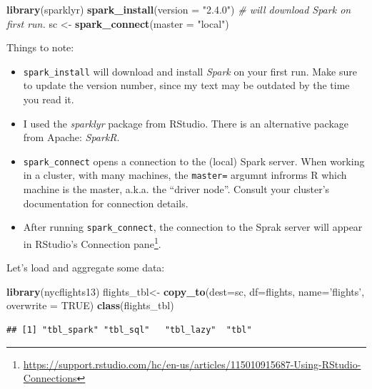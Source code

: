 \documentclass[]{book}
\newenvironment{Shaded}{\begin{snugshade}}{\end{snugshade}}
\newcommand{\CommentTok}[1]{\textcolor[rgb]{0.56,0.35,0.01}{\textit{#1}}}
\newcommand{\DataTypeTok}[1]{\textcolor[rgb]{0.13,0.29,0.53}{#1}}
\newcommand{\KeywordTok}[1]{\textcolor[rgb]{0.13,0.29,0.53}{\textbf{#1}}}
\newcommand{\NormalTok}[1]{#1}
\newcommand{\OtherTok}[1]{\textcolor[rgb]{0.56,0.35,0.01}{#1}}
\newcommand{\StringTok}[1]{\textcolor[rgb]{0.31,0.60,0.02}{#1}}
\providecommand{\tightlist}{%
  \setlength{\itemsep}{0pt}\setlength{\parskip}{0pt}}
\renewcommand{\href}[2]{#2\footnote{\url{#1}}}
\theoremstyle{definition}
\theoremstyle{definition}
\theoremstyle{definition}
\theoremstyle{remark}
\begin{document}
\begin{Shaded}
\begin{Highlighting}[]
\KeywordTok{library}\NormalTok{(sparklyr)}
\KeywordTok{spark_install}\NormalTok{(}\DataTypeTok{version =} \StringTok{"2.4.0"}\NormalTok{) }\CommentTok{# will download Spark on first run. }
\NormalTok{sc <-}\StringTok{ }\KeywordTok{spark_connect}\NormalTok{(}\DataTypeTok{master =} \StringTok{"local"}\NormalTok{)}
\end{Highlighting}
\end{Shaded}

Things to note:

\begin{itemize}
\tightlist
\item
  \texttt{spark\_install} will download and install \emph{Spark} on your first run. Make sure to update the version number, since my text may be outdated by the time you read it.
\item
  I used the \emph{sparklyr} package from RStudio. There is an alternative package from Apache: \emph{SparkR}.
\item
  \texttt{spark\_connect} opens a connection to the (local) Spark server. When working in a cluster, with many machines, the \texttt{master=} argumnt infrorms R which machine is the master, a.k.a. the ``driver node''. Consult your cluster's documentation for connection details.
\item
  After running \texttt{spark\_connect}, the connection to the Sprak server will appear in RStudio's \href{https://support.rstudio.com/hc/en-us/articles/115010915687-Using-RStudio-Connections}{Connection pane}.
\end{itemize}

Let's load and aggregate some data:

\begin{Shaded}
\begin{Highlighting}[]
\KeywordTok{library}\NormalTok{(nycflights13)}
\NormalTok{flights_tbl<-}\StringTok{ }\KeywordTok{copy_to}\NormalTok{(}\DataTypeTok{dest=}\NormalTok{sc, }\DataTypeTok{df=}\NormalTok{flights, }\DataTypeTok{name=}\StringTok{'flights'}\NormalTok{, }\DataTypeTok{overwrite =} \OtherTok{TRUE}\NormalTok{)}
\KeywordTok{class}\NormalTok{(flights_tbl)}
\end{Highlighting}
\end{Shaded}

\begin{verbatim}
## [1] "tbl_spark" "tbl_sql"   "tbl_lazy"  "tbl"
\end{verbatim}
\end{document}
